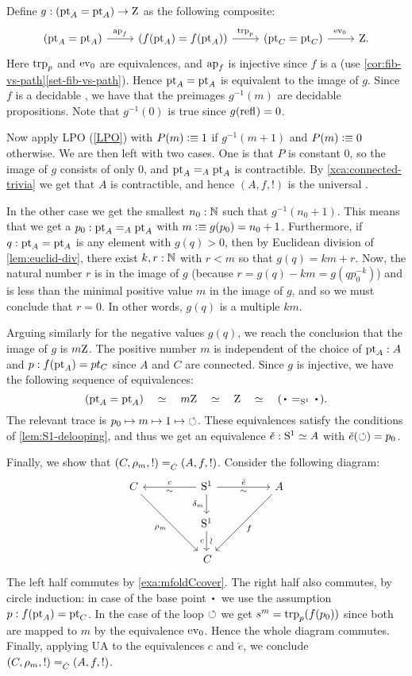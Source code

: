 Define $g: (\mathrm{pt}_A=\mathrm{pt}_A)\to\mathrm{Z}$ as the following composite:
\[
  \begin{tikzcd}
    (\pt_A=\pt_A)\ar[r,"\ap{f}"] &
    (f(\pt_A)=f(\pt_A))\ar[r,"\trp{p}"] &
    (\pt_C=\pt_C)\ar[r,"\ev_0\vphantom{\trp{p}}"] &
    \zet.
  \end{tikzcd}
\]
Here $\trp{p}$ and $\ev_0$ are equivalences, and $\ap{f}$ is injective
since $f$ is a \covering (use \cref{cor:fib-vs-path}\ref{set-fib-vs-path}).
Hence $\mathrm{pt}_A=\mathrm{pt}_A$ is equivalent to the image of $g$.
Since $f$ is a decidable \covering, we have that the preimages $g^{-1}(m)$
are decidable propositions. Note that $g^{-1}(0)$ is true since $g(\mathrm{refl}_{})=0$.

Now apply LPO (\cref{LPO}) with $P(m)\defeq 1$ if $g^{-1}(m+1)$ and $P(m)\defeq 0$ otherwise.
We are then left with two cases.
One is that $P$ is constant $0$, so the image of $g$ consists of only $0$,
and $\mathrm{pt}_A=_A\mathrm{pt}_A$ is contractible. By \cref{xca:connected-trivia}
we get that $A$ is contractible, and hence $(A,f,!)$ is the universal \covering.

In the other case we get the smallest $n_0: \mathbb{N}$ such that $g^{-1}(n_0 + 1)$.
This means that we get a $p_0:\mathrm{pt}_A=_A\mathrm{pt}_A$ with $m\defeq g(p_0)=n_0 +1$.
Furthermore, if $q:\mathrm{pt}_A=\mathrm{pt}_A$ is any element with $g(q)>0$, then  by Euclidean division of \cref{lem:euclid-div}, there exist $k,r:\mathbb{N}$ with $r<m$ so that $g(q)=km+r$.  Now, the natural number $r$ is in the image of $g$ (because $r=g(q)-km=g(qp_0^{-k})$) and is less than the minimal positive value $m$ in the image of $g$, and so we must conclude that $r=0$. In other words, $g(q)$ is a multiple $km$.

Arguing similarly for the negative values $g(q)$, we reach the conclusion that the image of $g$ is $m\mathrm{Z}$.
The positive number $m$ is independent of the choice of $\mathrm{pt}_A :A$ and $p: f(\mathrm{pt}_A)=pt_C$ since
$A$ and $C$ are connected. Since $g$ is injective, we have the following
sequence of equivalences:
\[
(\pt_A=\pt_A)\quad \equiv \quad m\zet \quad\equiv\quad \zet\quad \equiv\quad (\base=_{\Sc}\base).
\]
The relevant trace is $p_0 \mapsto m \mapsto 1 \mapsto {\circlearrowleft}$.
These equivalences satisfy the conditions of \cref{lem:S1-delooping},
and thus we get an equivalence $\check e: {\mathrm{S}^1}\simeq A$ with $\check e(\circlearrowleft) = p_0$.

Finally, we show that $(C,\cdg{m},!) =_{\hat C} (A,f,!)$.
Consider the following diagram:
\[
  \begin{tikzcd}[column sep=huge]
    C\ar[ddr,"\cdg{m}"'] &
    \Sc \ar[d,"\dg{m}"']\ar[l,"c"',"\sim"]\ar[r,"\check e","\sim"'] &
    A\ar[ddl,"f"] \\
    & \Sc \ar[d,"c"',"{\text{\rotatebox[origin=c]{270}{$\sim$}}}"] & \\
    & \,C &
  \end{tikzcd}
\]
The left half commutes by \cref{exa:mfoldCcover}.
The right half also commutes, by circle induction:
in case of the base point $\base$ we use the assumption $p: f(\mathrm{pt}_A)=\mathrm{pt}_C$.
In the case of the loop $\circlearrowleft$ we get $s^m = \trp{p}(f(p_0))$ since both
are mapped to $m$ by the equivalence $\ev_0$. Hence the whole diagram
commutes. Finally, applying UA to the equivalences $c$ and $\check e$,
we conclude $(C,\cdg{m},!) =_{\hat C} (A,f,!)$.

